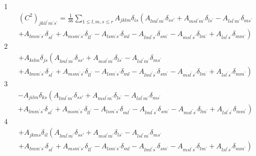 \documentclass[aps,preprint]{revtex4}%
\begin{document}
1%
\begin{align}
&  \left(  C^{2}\right)  _{jkil^{\prime}m^{\prime}s^{\prime}}=\frac{1}{36}%
\sum_{1\leq l,m,s\leq r}A_{jklm}\delta_{is}\left(  A_{lml^{\prime}m^{\prime}%
}\delta_{ss\prime}+A_{msl^{\prime}m^{\prime}}\delta_{ls^{\prime}%
}-A_{lsl^{\prime}m^{\prime}}\delta_{ms^{\prime}}\right. \\
&  \left.  +A_{lmm^{\prime}s^{\prime}}\delta_{sl^{\prime}}+A_{msm^{\prime
}s^{\prime}}\delta_{ll^{\prime}}-A_{lsm^{\prime}s^{\prime}}\delta
_{ml}-A_{lml^{\prime}s^{\prime}}\delta_{sm^{\prime}}-A_{msl^{\prime}s^{\prime
}}\delta_{lm^{\prime}}+A_{lsl^{\prime}s^{\prime}}\delta_{mm^{\prime}}\right)
\end{align}
2%
\begin{align}
&  +A_{kilm}\delta_{js}\left(  A_{lml^{\prime}m^{\prime}}\delta_{ss\prime
}+A_{msl^{\prime}m^{\prime}}\delta_{ls^{\prime}}-A_{lsl^{\prime}m^{\prime}%
}\delta_{ms^{\prime}}\right. \\
&  \left.  +A_{lmm^{\prime}s^{\prime}}\delta_{sl^{\prime}}+A_{msm^{\prime
}s^{\prime}}\delta_{ll^{\prime}}-A_{lsm^{\prime}s^{\prime}}\delta
_{ml}-A_{lml^{\prime}s^{\prime}}\delta_{sm^{\prime}}-A_{msl^{\prime}s^{\prime
}}\delta_{lm^{\prime}}+A_{lsl^{\prime}s^{\prime}}\delta_{mm^{\prime}}\right)
\end{align}
3%
\begin{align}
&  -A_{jilm}\delta_{ks}\left(  A_{lml^{\prime}m^{\prime}}\delta_{ss\prime
}+A_{msl^{\prime}m^{\prime}}\delta_{ls^{\prime}}-A_{lsl^{\prime}m^{\prime}%
}\delta_{ms^{\prime}}\right. \\
&  \left.  +A_{lmm^{\prime}s^{\prime}}\delta_{sl^{\prime}}+A_{msm^{\prime
}s^{\prime}}\delta_{ll^{\prime}}-A_{lsm^{\prime}s^{\prime}}\delta_{ml^{\prime
}}-A_{lml^{\prime}s^{\prime}}\delta_{sm^{\prime}}-A_{msl^{\prime}s^{\prime}%
}\delta_{lm^{\prime}}+A_{lsl^{\prime}s^{\prime}}\delta_{mm^{\prime}}\right)
\end{align}
4%
\begin{align}
&  +A_{jkms}\delta_{il}\left(  A_{lml^{\prime}m^{\prime}}\delta_{ss\prime
}+A_{msl^{\prime}m^{\prime}}\delta_{ls^{\prime}}-A_{lsl^{\prime}m^{\prime}%
}\delta_{ms^{\prime}}\right. \\
&  \left.  +A_{lmm^{\prime}s^{\prime}}\delta_{sl^{\prime}}+A_{msm^{\prime
}s^{\prime}}\delta_{ll^{\prime}}-A_{lsm^{\prime}s^{\prime}}\delta
_{ml}-A_{lml^{\prime}s^{\prime}}\delta_{sm^{\prime}}-A_{msl^{\prime}s^{\prime
}}\delta_{lm^{\prime}}+A_{lsl^{\prime}s^{\prime}}\delta_{mm^{\prime}}\right)
\end{align}
\end{document}
